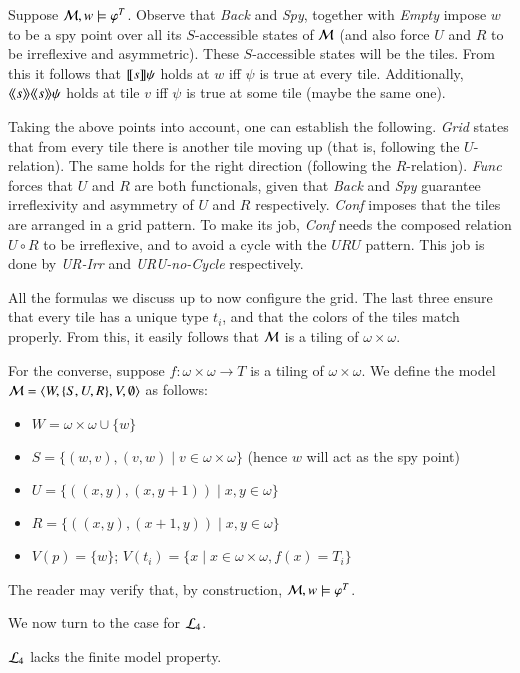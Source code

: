 \begin{pf}
Suppose $\mathcal{M},w\models\varphi^T$. Observe that \textit{Back} and
\textit{Spy}, together with \textit{Empty} impose $w$ to be a spy
point over all its $S$-accessible states of $\mathcal{M}$ (and also force
$U$ and $R$ to be irreflexive and asymmetric). These $S$-accessible
states will be the tiles. From this it follows that $[\![ s ]\!]\psi$
holds at $w$ iff $\psi$ is true at every tile. Additionally,
$\langle\!\langle s \rangle\!\rangle\langle\!\langle s \rangle\!\rangle\psi$ holds at tile $v$ iff $\psi$ is true at some
tile (maybe the same one).

Taking the above points into account, one can establish the
following. \textit{Grid} states that from every tile there is
another tile moving up (that is, following the $U$-relation). The
same holds for the right direction (following the $R$-relation).
\textit{Func} forces that $U$ and $R$ are both functionals, given
that \textit{Back} and \textit{Spy} guarantee irreflexivity and
asymmetry of $U$ and $R$ respectively. \textit{Conf} imposes that
the tiles are arranged in a grid pattern. To make its job,
\textit{Conf} needs the composed relation $U\circ R$ to be
irreflexive, and to avoid a cycle with the $URU$ pattern. This job
is done by \textit{UR-Irr} and \textit{URU-no-Cycle} respectively.

All the formulas we discuss up to now configure the grid. The last
three ensure that every tile has a unique type $t_i$, and that the
colors of the tiles match properly. From this, it easily follows
that $\mathcal{M}$ is a tiling of $\omega\times\omega$.

For the converse, suppose $f:\omega\times\omega\to T$ is a tiling of
$\omega\times\omega$. We define the model
$\mathcal{M}=\langle W,\{S,U,R\},V,\emptyset \rangle$ as follows:
\begin{itemize}
\item $W=\omega\times\omega \cup \{w\}$
\item $S=\{(w,v),(v,w)\mid v\in\omega\times\omega\}$  (hence $w$ will act as the spy
point)
\item $U=\{((x,y),(x,y+1))\mid x,y\in\omega\}$
\item $R=\{((x,y),(x+1,y))\mid x,y\in\omega\}$
\item $V(p)=\{w\}$; $V(t_i)=\{x\mid x\in\omega\times\omega, f(x)=T_i\}$
\end{itemize}
The reader may verify that, by construction,
$\mathcal{M},w\models\varphi^T$.
\end{pf}

We now turn to the case for $\mathcal{L}_4$.


\begin{thm}\label{thm:tlme:inf}
$\mathcal{L}_4$ lacks the finite model property.
%
\end{thm}

